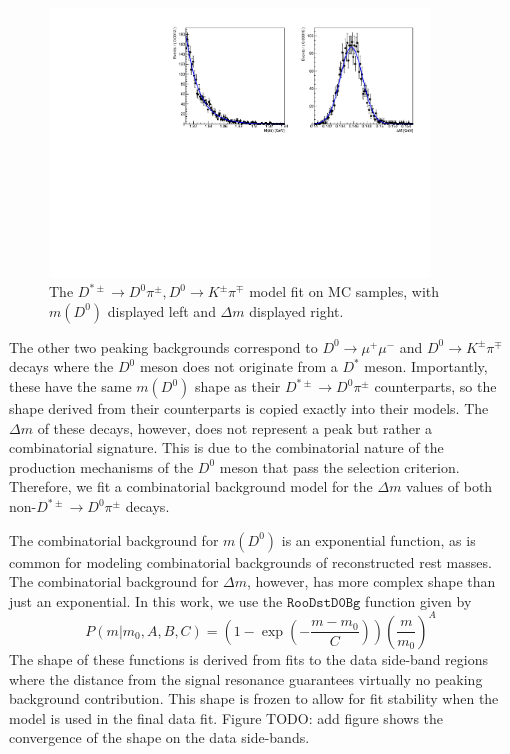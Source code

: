 \begin{figure}[htp]
    \begin{center}
      \includegraphics[width=0.9\textwidth]{figures/chapter4/normalization_fit/dpipi_fit_mc_kpi.pdf}
    \end{center}
    \caption{
      The $D^{*\pm} \to D^0\pi^\pm, D^0 \to K^\pm \pi^\mp$ model fit on MC samples, with $m(D^0)$ displayed left and $\Delta m$ displayed right.
    }
    \label{fig:d0pipi_uml_fit_kpi_model}
\end{figure}

The other two peaking backgrounds correspond to $D^0 \to \mu^+ \mu^-$ and $D^0 \to K^\pm \pi^\mp$ decays where the $D^0$ meson does not originate from a $D^*$ meson. Importantly, these have the same $m(D^0)$ shape as their $D^{*\pm} \to D^0 \pi^\pm$ counterparts, so the shape derived from their counterparts is copied exactly into their models. The $\Delta m$ of these decays, however, does not represent a peak but rather a combinatorial signature. This is due to the combinatorial nature of the production mechanisms of the $D^0$ meson that pass the selection criterion. Therefore, we fit a combinatorial background model for the $\Delta m$ values of both non-$D^{*\pm} \to D^0 \pi^\pm$ decays. 

The combinatorial background for $m(D^0)$ is an exponential function, as is common for modeling combinatorial backgrounds of reconstructed rest masses. The combinatorial background for $\Delta m$, however, has more complex shape than just an exponential. In this work, we use the $\texttt{RooDstD0Bg}$ function \cite{ref:verkerke2003roofit} given by
\begin{equation}
    P(m|m_0, A, B, C) = \left(1 - \exp \left(-\frac{m-m_0}{C} \right) \right) \left( \frac{m}{m_0}\right)^A
\end{equation}
The shape of these functions is derived from fits to the data side-band regions where the distance from the signal resonance guarantees virtually no peaking background contribution. This shape is frozen to allow for fit stability when the model is used in the final data fit. Figure TODO: add figure shows the convergence of the shape on the data side-bands.

